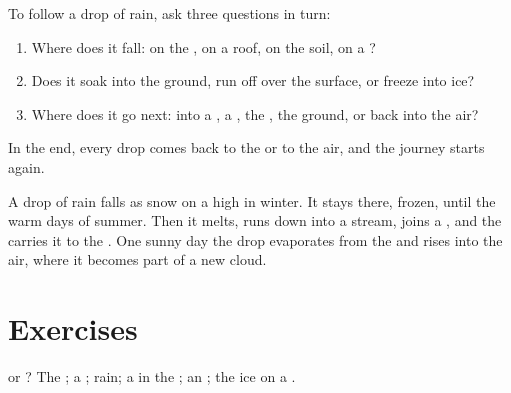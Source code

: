 \begin{method}\label{met:g2:water-on-earth:drop}
To follow a drop of rain, ask three questions in turn:
\begin{enumerate}
  \item Where does it fall: on the , on a roof, on the soil, on a
        ?
  \item Does it soak into the ground, run off over the surface, or freeze
        into ice?
  \item Where does it go next: into a , a , the , the ground,
        or back into the air?
\end{enumerate}
In the end, every drop comes back to the  or to the air, and the
journey starts again.
\end{method}

\begin{example}\label{ex:g2:water-on-earth:mountain}
A drop of rain falls as snow on a high  in winter. It stays there,
frozen, until the warm days of summer. Then it melts, runs down into a
 stream, joins a , and the  carries it to the . One
sunny day the drop evaporates from the  and rises into the air, where it
becomes part of a new cloud.
\end{example}

\section{Exercises}

\begin{exercise}[$\star$]\label{exo:g2:water-on-earth:1}
 or ? The ; a ; rain; a  in the
; an ; the ice on a .
\end{exercise}

